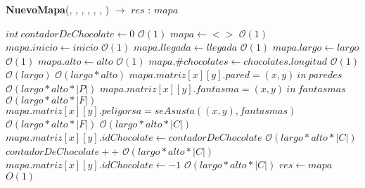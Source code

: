 \documentclass[10pt, a4paper]{article}
\newcommand{\bigO}{\mathcal{O}}
\begin{document}
        \begin{Algoritmos}

        \begin{algorithm}[H]{\textbf{NuevoMapa}({, , , , , , }) $\to$ $res$ : $mapa$}
            \begin{algorithmic}[1]
                \State $int\ contadorDeChocolate \gets 0$                               \Comment $\bigO(1)$
                \State $mapa \gets <>$                               \Comment $\bigO(1)$
                \State $mapa.inicio  \gets inicio$                           \Comment $\bigO(1)$
                \State $mapa.llegada \gets llegada$           \Comment $\bigO(1)$
                \State $mapa.largo \gets largo$                               \Comment $\bigO(1)$
                \State $mapa.alto  \gets alto$                           \Comment $\bigO(1)$
                \State $mapa.\#chocolates \gets chocolates.longitud$           \Comment $\bigO(1)$
                                    \Comment $\bigO(largo)$
                                        \Comment $\bigO(largo*alto)$
                    \State $mapa.matriz[x][y].pared = (x,y) \ in \ paredes$                                        \Comment $\bigO(largo*alto*|P|)$
                        \State $mapa.matriz[x][y].fantasma = (x,y) \ in \ fantasmas$                                        \Comment $\bigO(largo*alto*|F|)$
                        \State $mapa.matriz[x][y].peligorsa = seAsusta((x,y),fantasmas)$                                        \Comment $\bigO(largo*alto*|F|)$
                                                                               \Comment $\bigO(largo*alto*|C|	)$
                        \State $mapa.matriz[x][y].idChocolate \gets contadorDeChocolate$                    \Comment $\bigO(largo*alto*|C|)$
                        \State $contadorDeChocolate++ $                                     \Comment $\bigO(largo*alto*|C|)$
                        \Else
                        \State $mapa.matriz[x][y].idChocolate \gets -1$                                      \Comment $\bigO(largo*alto*|C|)$
                        \EndIf
                    \EndFor
                \EndFor                                            
                \State $res \gets mapa$                              \Comment $O(1)$
    

\end{algorithmic}
\end{algorithm}
\end{Algoritmos}
\end{document}
